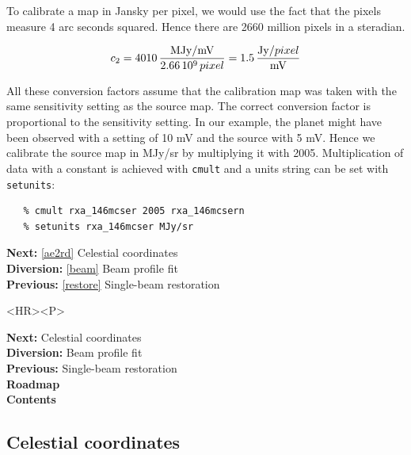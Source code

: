 \documentclass[11pt]{article}
\newenvironment{latexonly}{}{}
\newcommand{\htmlref}[2]{#1}
\newcommand{\xref}[3]{#1}
\newcommand{\xlabel}[1]{}
\begin{document}
   To calibrate a map in Jansky per pixel, we would use the fact that
   the pixels measure 4 arc seconds squared. Hence there are 2660
   million pixels in a steradian.

\[c_2 = 4010\,{{\rm MJy/mV}   \over 2.66\,10^9\,pixel}
      =  1.5\,{{\rm Jy}/pixel \over {\rm mV}}\]

   All these conversion factors assume that the calibration map was
   taken with the same sensitivity setting as the source map. The
   correct conversion factor is proportional to the sensitivity
   setting. In our example, the planet might have been observed with a
   setting of 10 mV and the source with 5 mV. Hence we calibrate the
   source map in MJy/sr by multiplying it with 2005.
   Multiplication of data with a constant is achieved with
{\tt \xref{cmult}{sun95}{CMULT}}
   and a units string can be set with
{\tt \xref{setunits}{sun95}{SETUNITS}}:

\begin{verbatim}
   % cmult rxa_146mcser 2005 rxa_146mcsern
   % setunits rxa_146mcser MJy/sr
\end{verbatim}

\begin{latexonly}
{\bf Next:} \ref{ae2rd} Celestial coordinates\\
{\bf Diversion:} \ref{beam} Beam profile fit\\
{\bf Previous:} \ref{restore} Single-beam restoration\\
\end{latexonly}

\begin{htmlonly}
\begin{rawhtml} <HR><P> \end{rawhtml}
{\bf \htmlref{Next:}{ae2rd}} Celestial coordinates\\
{\bf \htmlref{Diversion:}{beam}} Beam profile fit\\
{\bf \htmlref{Previous:}{restore}} Single-beam restoration\\
{\bf \htmlref{Roadmap}{roadmap}}\\
{\bf \htmlref{Contents}{stardoccontents}}\\
\end{htmlonly}


\subsection{\label{ae2rd}\xlabel{ae2rd}Celestial coordinates}
\end{document}
